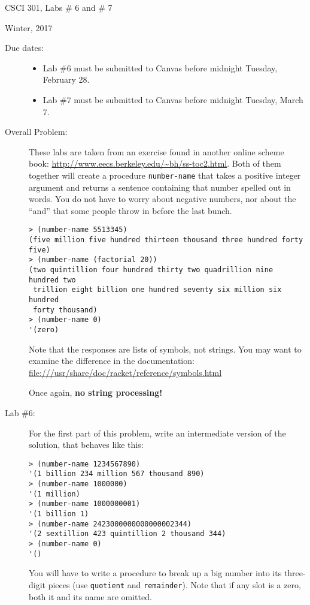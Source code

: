 \documentclass{article}
\begin{document}
\centerline{\Large CSCI 301, Labs \# 6 and \# 7}
\centerline{\large Winter, 2017}

\begin{description}
\item[Due dates:]  \begin{itemize}\item
Lab \#6 must be submitted to Canvas before midnight
  Tuesday, February 28.
\item Lab \#7 must be submitted to Canvas before midnight
  Tuesday, March 7.
\end{itemize}

\item[Overall Problem:]
These labs are taken from an exercise found in another
online scheme book: \url{http://www.eecs.berkeley.edu/~bh/ss-toc2.html}.
Both of them together will create a 
procedure {\tt number-name} that takes a positive integer argument
and returns a sentence containing that number spelled out in words.
You do not have to worry about negative numbers, nor about the ``and''
that some people throw in before the last bunch.
\begin{Verbatim}[frame=single]
> (number-name 5513345)
(five million five hundred thirteen thousand three hundred forty five)
> (number-name (factorial 20))
(two quintillion four hundred thirty two quadrillion nine hundred two
 trillion eight billion one hundred seventy six million six hundred
 forty thousand)
> (number-name 0)
'(zero)
\end{Verbatim}
Note that the responses are lists of symbols, not strings.  You may
want to examine the difference in the documentation:
{\url{file:///usr/share/doc/racket/reference/symbols.html}}

Once again, {\bf no string processing!}


\item[Lab \#6:]  For the first part of this problem, 
  write an intermediate version of the solution, that behaves like this:
\begin{Verbatim}[frame=single]
> (number-name 1234567890)
'(1 billion 234 million 567 thousand 890)
> (number-name 1000000)
'(1 million)
> (number-name 1000000001)
'(1 billion 1)
> (number-name 2423000000000000002344)
'(2 sextillion 423 quintillion 2 thousand 344)
> (number-name 0)
'()
\end{Verbatim}
You will have to write a procedure to break up a big number into its
three-digit pieces (use {\tt quotient} and {\tt remainder}).
Note that if any slot is a zero, both it and its name are omitted.


\end{description}
\end{document}
